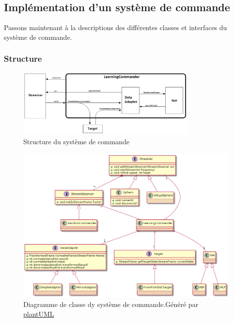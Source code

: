 \subsection{Implémentation d'un système de commande}
Passons maintenant à la descriptions des différentes classes et interfaces du système de commande.

\newcommand{\classname}[1]{\textbf{\texttt{#1}}}
\subsubsection{Structure}
\begin{figure}
 \centering
 \includegraphics[width=0.8\textwidth]{../figures/commander.jpg}
 \caption{Structure du système de commande}
 \label{fig:commander}
\end{figure}
\begin{figure}
 \centering
 \includegraphics[width=\textwidth]{../../uml/commanderdiag.png}
 \caption{Diagramme de classe dy système de commande.\footnotesize Généré par \href{http://plantuml.com/class-diagram}{plantUML}}
 \label{fig:commanderdiag}
\end{figure}

